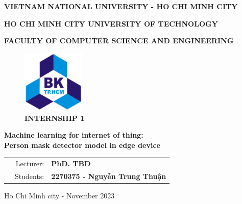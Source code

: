 \begin{titlepage}
\centerline{\bf \normalsize VIETNAM NATIONAL UNIVERSITY - HO CHI MINH CITY}
\centerline{\bf \normalsize HO CHI MINH CITY UNIVERSITY OF TECHNOLOGY}
\centerline{\bf \normalsize FACULTY OF COMPUTER SCIENCE AND ENGINEERING}
\vspace*{1cm}
\begin{figure}[h!]
	\begin{center}
		\includegraphics[width=3cm]{image/bku.png}
		\\
		\vspace{.5cm}
		\LARGE \textbf{INTERNSHIP 1}
	\end{center}
\end{figure}

\begin{center}
    \LARGE \textbf{Machine learning for internet of thing:\\Person mask detector model in edge device} \\
\end{center}

\vspace{3em}

\begin{table}[h]
\begin{tabular}{rrl}
\hspace{2.5 cm} & Lecturer: & \bf PhD. TBD\\
& Students:  & \bf 2270375 - Nguyễn Trung Thuận\\
\end{tabular}
\end{table}

\vspace{2.5em}

\vfill
\begin{center}
	{\normalsize Ho Chi Minh city - November 2023}
\end{center}
\end{titlepage}


\newpage

\thispagestyle{empty}